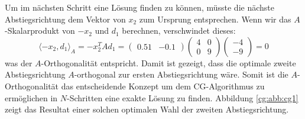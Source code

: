 Um im nächsten Schritt eine Lösung finden zu können, müsste die nächste Abstiegsrichtung dem Vektor von $x_2$ zum Ursprung entsprechen.
Wenn wir das $A$-Skalarprodukt von $-x_2$ und $d_1$ berechnen, verschwindet dieses:
\begin{equation}
	\langle -x_2 , d_1 \rangle_A = 	-x_2^T A d_1 = 
		\begin{pmatrix} 0.51 & -0.1 \end{pmatrix} 
		\begin{pmatrix} 4 & 0\\
						0 & 9 
		\end{pmatrix} 
		\begin{pmatrix} -4\\
						-9 
		\end{pmatrix} = 0 \nonumber
\end{equation}
was der $A$-Orthogonalität entspricht.
Damit ist gezeigt, dass die optimale zweite Abstiegsrichtung $A$-orthogonal zur ersten Abstiegsrichtung wäre.
Somit ist die $A$-Orthogonalität das entscheidende Konzept um dem CG-Algorithmus zu ermöglichen in $N$-Schritten eine exakte Lösung zu finden.
Abbildung \ref{cg:abb:cg1} zeigt das Resultat einer solchen optimalen Wahl der zweiten Abstiegsrichtung.

